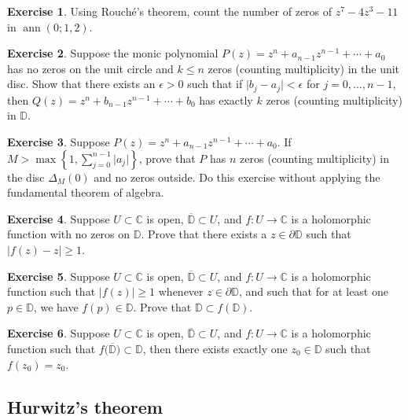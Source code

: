 \documentclass[12pt,openany]{book}
\newcommand{\ann}{\operatorname{ann}}
\newcommand{\sabs}[1]{\lvert {#1} \rvert}
\newcommand{\C}{{\mathbb{C}}}
\newcommand{\D}{{\mathbb{D}}}
\theoremstyle{plain}
\theoremstyle{remark}
\theoremstyle{definition}
\newenvironment{exbox}{%
    \def\FrameCommand{\vrule width 1pt \relax\hspace{10pt}}%
    \MakeFramed{\advance\hsize-\width\FrameRestore}%
}{%
    \endMakeFramed
}
\theoremstyle{exercise}
\newtheorem{exercise}{Exercise}[section]
\theoremstyle{example}
\begin{document}
\begin{exbox}
\begin{exercise}
Using Rouch\'e's theorem, count the number of zeros of $z^7-4z^3-11$ in $\ann(0;1,2)$.
\end{exercise}

\begin{exercise}
Suppose 
the monic polynomial
$P(z) = z^n + a_{n-1} z^{n-1} + \cdots + a_0$
has no zeros on the unit circle and $k \leq n$ zeros
(counting multiplicity)
in the unit disc.  Show that there exists an $\epsilon > 0$ such that
if $\sabs{b_j-a_j} < \epsilon$ for $j=0,\ldots,n-1$, then
$Q(z) = z^n + b_{n-1} z^{n-1} + \cdots + b_0$ has
exactly $k$ zeros (counting multiplicity) in $\D$.
\end{exercise}

\begin{exercise}
Suppose 
$P(z) = z^n + a_{n-1} z^{n-1} + \cdots + a_0$.
If $M > \max\left\{ 1, \sum_{j=0}^{n-1} \sabs{a_j} \right\}$,
prove that $P$ has $n$ zeros (counting multiplicity) in the disc $\Delta_M(0)$
and no zeros outside.  Do this exercise without applying the fundamental theorem of
algebra.
\end{exercise}

\begin{exercise}
Suppose $U \subset \C$ is open, $\overline{\D} \subset U$,
and $f \colon U \to \C$ is a holomorphic function with no zeros on
$\D$.  Prove that there exists a $z \in \partial \D$
such that $\sabs{f(z)-z} \geq 1$.
\end{exercise}

\begin{exercise}
Suppose $U \subset \C$ is open, $\overline{\D} \subset U$,
and $f \colon U \to \C$ is a holomorphic function such
that $\sabs{f(z)} \geq 1$ whenever $z \in \partial \D$,
and such that for at least one $p \in \D$, we have $f(p) \in \D$.
Prove that $\D \subset f(\D)$.
\end{exercise}

\begin{exercise}
Suppose $U \subset \C$ is open, $\overline{\D} \subset U$,
and $f \colon U \to \C$ is a holomorphic function such
that $f\bigl(\overline{\D}\bigr) \subset \D$, then there exists
exactly one $z_0 \in \D$ such that $f(z_0) = z_0$.
\end{exercise}
\end{exbox}

\subsection{Hurwitz's theorem}
\end{document}
